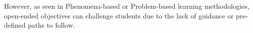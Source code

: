 





However, as seen in Phenomena-based or Problem-based learning methodologies, open-ended objectives can challenge students due to the lack of guidance or pre-defined paths to follow.


